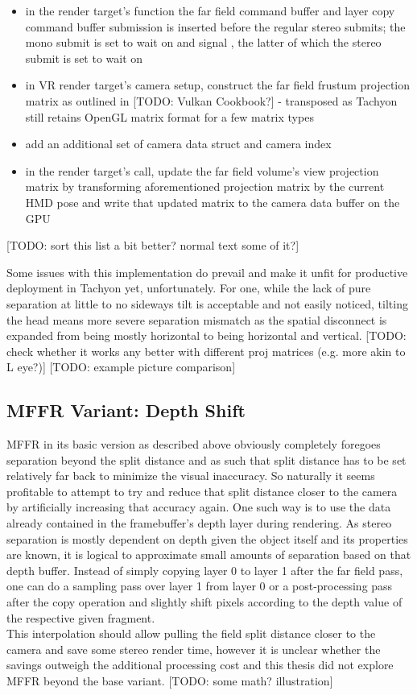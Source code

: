 \begin{itemize}
\item in the render target's  function the far field command buffer and layer copy command buffer submission is inserted before the regular stereo submits; the mono submit is set to wait on  and signal , the latter of which the stereo submit is set to wait on
\item in VR render target's camera setup, construct the far field frustum projection matrix as outlined in [TODO: Vulkan Cookbook?] - transposed as Tachyon still retains OpenGL matrix format for a few matrix types
\item add an additional set of camera data struct and camera index
\item in the render target's  call, update the far field volume's view projection matrix by transforming aforementioned projection matrix by the current HMD pose and write that updated matrix to the camera data buffer on the GPU
\end{itemize}
[TODO: sort this list a bit better? normal text some of it?]

Some issues with this implementation do prevail and make it unfit for productive deployment in Tachyon yet, unfortunately. For one, while the lack of pure separation at little to no sideways tilt is acceptable and not easily noticed, tilting the head means more severe separation mismatch as the spatial disconnect is expanded from being mostly horizontal to being horizontal and vertical. 
[TODO: check whether it works any better with different proj matrices (e.g. more akin to L eye?)]
[TODO: example picture comparison]



\subsection{MFFR Variant: Depth Shift}  \label{mffr_depthshift}
MFFR in its basic version as described above obviously completely foregoes separation beyond the split distance and as such that split distance has to be set relatively far back to minimize the visual inaccuracy. So naturally it seems profitable to attempt to try and reduce that split distance closer to the camera by artificially increasing that accuracy again. One such way is to use the data already contained in the framebuffer's depth layer during rendering. 
As stereo separation is mostly dependent on depth given the object itself and its properties are known, it is logical to approximate small amounts of separation based on that depth buffer. 
Instead of simply copying layer 0 to layer 1 after the far field pass, one can do a sampling pass over layer 1 from layer 0 or a post-processing pass after the copy operation and slightly shift pixels according to the depth value of the respective given fragment. \\
This interpolation should allow pulling the field split distance closer to the camera and save some stereo render time, however it is unclear whether the savings outweigh the additional processing cost and this thesis did not explore MFFR beyond the base variant. 
[TODO: some math? illustration]

